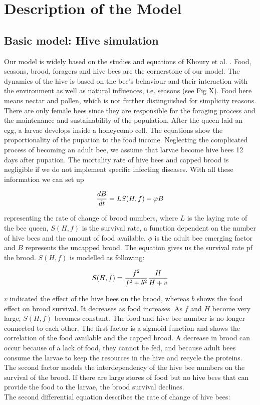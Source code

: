 \section{Description of the Model}
\subsection{Basic model: Hive simulation}
	Our model is widely based on the studies and equations of Khoury et al. \cite{khoury13}. Food, seasons, brood, foragers and hive bees are the cornerstone of our model. The dynamics of the hive is based on the bee's behaviour and their interaction with the environment as well as natural influences, i.e. seasons (see Fig X). Food here means nectar and pollen, which is not further distinguished for simplicity reasons. There are only female bees since they are responsible for the foraging process and the maintenance and sustainability of the population. After the queen laid an egg, a larvae develops inside a honeycomb cell. The equations show the proportionality of the pupation to the food income. Neglecting the complicated process of becoming an adult bee, we assume that larvae become hive bees 12 days after pupation. The mortality rate of hive bees and capped brood is negligible if we do not implement specific infecting diseases. With all these information we can set up
	
	\begin{equation}\label{eq:changeBroodNumbers}
		{dB \over dt} = LS(H,f)-\phi B
	\end{equation}
	
	representing the rate of change of brood numbers, where $L$ is the laying rate of the bee queen, $S(H,f)$ is the survival rate, a function dependent on the number of hive bees and the amount of food available. $\phi$ is the adult bee emerging factor and $B$ represents the uncapped brood. The equation gives us the survival rate pf the brood. $S(H,f)$ is modelled as following:
	
	\begin{equation}\label{eq:functionHiveBeesFood}
		S(H,f)={f^2 \over f^2+b^2}{H \over H+v}
	\end{equation}
	
	$v$ indicated the effect of the hive bees on the brood, whereas $b$ shows the food effect on brood survival. It decreases as food increases. As $f$ and $H$ become very large, $S(H,f)$ becomes constant. The food and hive bee number is no longer connected to each other. The first factor is a sigmoid function and shows the correlation of the food available and the capped brood. A decrease in brood can occur because of a lack of food, they cannot be fed, and because adult bees consume the larvae to keep the resources in the hive and recycle the proteins. The second factor models the interdependency of the hive bee numbers on the survival of the brood. If there are large stores of food but no hive bees that can provide the food to the larvae, the brood survival declines.  
	\\
	The second differential equation describes the rate of change of hive bees:
	
